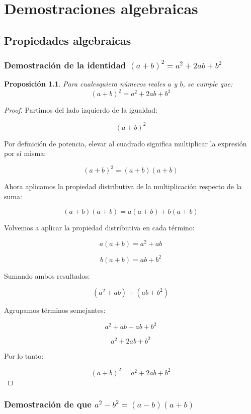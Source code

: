 \documentclass[12pt,final]{report}
\theoremstyle{plain}
\newtheorem{proposition}[theorem]{Proposición}
\theoremstyle{definition}
\begin{document}
\newpage

\chapter{Demostraciones algebraicas}

\section{Propiedades algebraicas}

\subsection{Demostración de la identidad $(a+b)^2 = a^2 + 2ab + b^2$}

\begin{proposition}
Para cualesquiera números reales $a$ y $b$, se cumple que:
\[
(a+b)^2 = a^2 + 2ab + b^2
\]
\end{proposition}

\begin{proof}

Partimos del lado izquierdo de la igualdad:

\[
(a+b)^2
\]

Por definición de potencia, elevar al cuadrado significa multiplicar la expresión por sí misma:

\[
(a+b)^2 = (a+b)(a+b)
\]

Ahora aplicamos la propiedad distributiva de la multiplicación respecto de la suma:

\[
(a+b)(a+b) = a(a+b) + b(a+b)
\]

Volvemos a aplicar la propiedad distributiva en cada término:

\[
a(a+b) = a^2 + ab
\]

\[
b(a+b) = ab + b^2
\]

Sumando ambos resultados:

\[
(a^2 + ab) + (ab + b^2)
\]

Agrupamos términos semejantes:

\[
a^2 + ab + ab + b^2
\]

\[
a^2 + 2ab + b^2
\]

Por lo tanto:

\[
(a+b)^2 = a^2 + 2ab + b^2
\]

\end{proof}

\newpage

\subsection{Demostración de que $a^2-b^2=(a-b)(a+b)$}
\end{document}
